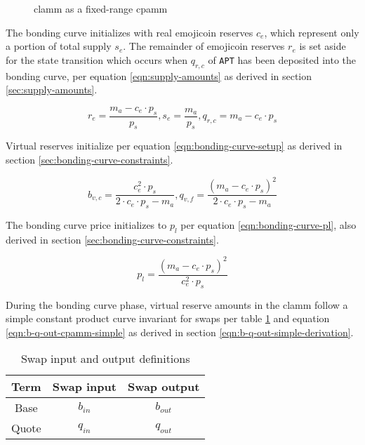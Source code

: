 \documentclass[table, twocolumn]{article}
\begin{document}
\begin{figure}[!htb]
  \centering
  
  \caption{\gls*{clamm} as a fixed-range \gls*{cpamm}}
  \label{fig:clamm-curve-translation}
\end{figure}

The bonding curve initializes with real emojicoin reserves $c_e$, which represent only a
portion of total supply $s_e$. The remainder of emojicoin reserves $r_e$ is set aside
for the state transition which occurs when $q_{r, c}$ of \texttt{APT} has been deposited
into the bonding curve, per equation \ref{eqn:supply-amounts} as derived in section
\ref{sec:supply-amounts}.

\begin{equation} \label{eqn:supply-amounts}
  r_e = \frac{m_a - c_e \cdot p_s}{p_s},
  s_e = \frac{m_a}{p_s},
  q_{r, c} = m_a - c_e \cdot p_s
\end{equation}

Virtual reserves initialize per equation \ref{eqn:bonding-curve-setup} as derived in
section \ref{sec:bonding-curve-constraints}.

\begin{equation} \label{eqn:bonding-curve-setup}
  b_{v, c} = \frac{c_e ^ 2 \cdot p_s}{2 \cdot c_e \cdot p_s - m_a},
  q_{v, f} = \frac{(m_a - c_e \cdot p_s) ^ 2}{2 \cdot c_e \cdot p_s - m_a}
\end{equation}

The bonding curve price initializes to $p_l$ per equation \ref{eqn:bonding-curve-pl},
also derived in section \ref{sec:bonding-curve-constraints}.

\begin{equation} \label{eqn:bonding-curve-pl}
  p_l = \frac{(m_a - c_e \cdot p_s) ^ 2}{c_e ^ 2 \cdot p_s}
\end{equation}

During the bonding curve phase, virtual reserve amounts in the \gls*{clamm} follow a
simple constant product curve invariant for swaps per table \ref{tab:swap-in-out}
and equation \ref{eqn:b-q-out-cpamm-simple} as derived in section
\ref{eqn:b-q-out-simple-derivation}.

\begin{table}[!htb]
  \centering
  \begin{tabular}{|c|c|c|}
    \hline \rowcolor{blue}
    Term  & Swap input & Swap output \\ \hline
    Base  & $b_{in}$   & $b_{out}$   \\ \hline
    Quote & $q_{in}$   & $q_{out}$   \\ \hline
  \end{tabular}
  \caption{Swap input and output definitions}
  \label{tab:swap-in-out}
\end{table}
\end{document}
